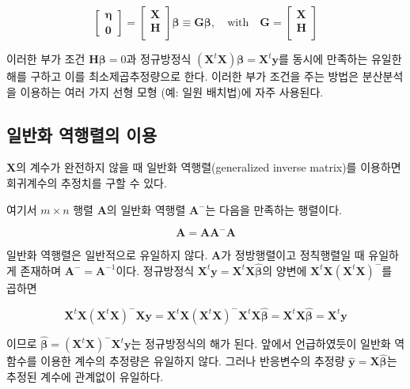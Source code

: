 \documentclass[
  10pt,
]{book}
\theoremstyle{definition}
\theoremstyle{definition}
\theoremstyle{definition}
\theoremstyle{definition}
\theoremstyle{remark}
\begin{document}
\begin{equation*}
\begin{bmatrix}
\bm \eta \\
\bm 0
\end{bmatrix}
=
\begin{bmatrix}
\bm X \\
\bm H \\
\end{bmatrix}
\bm \beta
\equiv
\bm G \bm \beta,
\quad \text{with} \quad
\bm G =
\begin{bmatrix}
\bm X \\
\bm H \\
\end{bmatrix}
\end{equation*}

이러한 부가 조건 \(\bm H \bm \beta =0\)과 정규방정식 \((\bm X^t \bm X ) \bm \beta = \bm X^t \bm y\)를 동시에 만족하는 유일한 해를 구하고 이를 최소제곱추정량으로 한다. 이러한 부가 조건을 주는 방법은 분산분석을 이용하는 여러 가지 선형 모형 (예: 일원 배치법)에 자주 사용된다.

\hypertarget{uxc77cuxbc18uxd654-uxc5eduxd589uxb82cuxc758-uxc774uxc6a9}{%
\subsection{일반화 역행렬의 이용}\label{uxc77cuxbc18uxd654-uxc5eduxd589uxb82cuxc758-uxc774uxc6a9}}

\(\bm X\)의 계수가 완전하지 않을 때 일반화 역행렬(generalized inverse matrix)를 이용하면 회귀계수의 추정치를 구할 수 있다.

여기서 \(m \times n\) 행렬 \(\bm A\)의 일반화 역행렬 \(\bm A^{-}\)는 다음을 만족하는 행렬이다.

\[
\bm A = \bm A \bm A^{-} \bm A
\]

일반화 역행렬은 일반적으로 유일하지 않다. \(\bm A\)가 정방행렬이고 정칙행렬일 때 유일하게 존재하며 \(\bm A^- = \bm A^{-1}\)이다.
정규방정식 \(\bm X^t \bm y=\bm X^t \bm X \hat {\bm \beta}\)의 양변에 \(\bm X^t \bm X (\bm X^t \bm X )^-\)를 곱하면

\[\bm X^t \bm X  (\bm X^t \bm X )^- \bm X \bm y = 
\bm X^t \bm X  (\bm X^t \bm X )^- \bm X^t \bm X \hat {\bm \beta} = 
\bm X^t \bm X  \hat {\bm \beta} = \bm X^t \bm y 
\]

이므로 \(\hat {\bm \beta} = (\bm X^t \bm X )^- \bm X^t \bm y\)는 정규방정식의 해가 된다. 앞에서 언급하였듯이 일반화 역함수를 이용한 계수의 추정량은 유일하지 않다. 그러나 반응변수의 추정량 \(\hat {\bm y} = \bm X \hat {\bm \beta}\)는 추정된 계수에 관계없이 유일하다.
\end{document}
